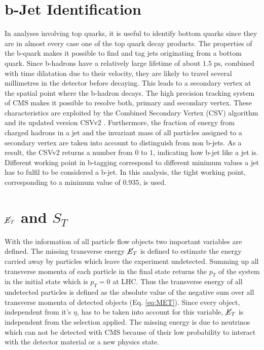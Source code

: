 \section{b-Jet Identification}
\label{sec:btag}
	In analyses involving top quarks, it is useful to identify bottom quarks since they are in almost every case one of the top quark decay products. The properties of the b-quark makes it possible to find and tag jets originating from a bottom quark. Since b-hadrons have a relatively large lifetime of about $1.5\;\text{ps}$, combined with time dilatation due to their velocity, they are likely to travel several millimetres in the detector before decaying. This leads to a secondary vertex at the spatial point where the b-hadron decays. The high precision tracking system of CMS makes it possible to resolve both, primary and secondary vertex. These characteristics are exploited by the Combined Secondary Vertex (CSV) algorithm \cite{csv} and its updated version CSVv2 \cite{btag}. Furthermore, the fraction of energy from charged hadrons in a jet and the invariant mass of all particles assigned to a secondary vertex are taken into account to distinguish from non b-jets. As a result, the CSVv2 returns a number from $0$ to $1$, indicating how b-jet like a jet is. Different working point in b-tagging correspond to different minimum values a jet has to fulfil to be considered a b-jet. In this analysis, the tight working point, corresponding to a minimum value of $0.935$, is used. 

\section{$\cancel{E}_T$ and $S_T$}
	With the information of all particle flow objects two important variables are defined. The missing transverse energy $\cancel{E}_T$ is defined to estimate the energy carried away by particles which leave the experiment undetected. Summing up all transverse momenta of each particle in the final state returns the $p_T$ of the system in the initial state which is $p_T = 0$ at LHC. Thus the transverse energy of all undetected particles is defined as the absolute value of the negative sum over all transverse momenta of detected objects (Eq. \ref{eq:MET}). Since every object, independent from it's $\eta$, has to be taken into account for this variable, $\cancel{E}_T$ is independent from the selection applied. The missing energy is due to neutrinos which can not be detected with CMS because of their low probability to interact with the detector material or a new physics state. 
	
